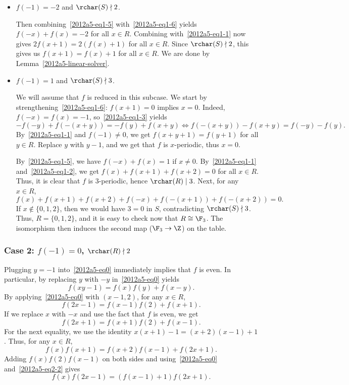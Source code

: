 \begin{itemize}

    \item
    $f(-1) = -2$ and $\rchar(S) \nmid 2$.
    
    Then combining~\eqref{2012a5-eq1-5} with~\eqref{2012a5-eq1-6} yields $f(-x) + f(x) = -2$ for all $x \in R$.
    Combining with~\eqref{2012a5-eq1-1} now gives $2 f(x + 1) = 2 (f(x) + 1)$ for all $x \in R$.
    Since $\rchar(S) \nmid 2$, this gives us $f(x + 1) = f(x) + 1$ for all $x \in R$.
    We are done by Lemma~\ref{2012a5-linear-solver}.


    \item
    $f(-1) = 1$ and $\rchar(S) \nmid 3$.

    We will assume that $f$ is reduced in this subcase.
    We start by strengthening~\eqref{2012a5-eq1-6}: $f(x + 1) = 0$ implies $x = 0$.
    Indeed, $f(-x) = f(x) = -1$, so~\eqref{2012a5-eq1-3} yields
    \[ -f(-y) + f(-(x + y)) = -f(y) + f(x + y) \iff f(-(x + y)) - f(x + y) = f(-y) - f(y). \]
    By~\eqref{2012a5-eq1-1} and $f(-1) \neq 0$, we get $f(x + y + 1) = f(y + 1)$ for all $y \in R$.
    Replace $y$ with $y - 1$, and we get that $f$ is $x$-periodic, thus $x = 0$.

    By~\eqref{2012a5-eq1-5}, we have $f(-x) + f(x) = 1$ if $x \neq 0$.
    By~\eqref{2012a5-eq1-1} and~\eqref{2012a5-eq1-2}, we get $f(x) + f(x + 1) + f(x + 2) = 0$ for all $x \in R$.
    Thus, it is clear that $f$ is $3$-periodic, hence $\rchar(R) \mid 3$.
    Next, for any $x \in R$,
    \[ f(x) + f(x + 1) + f(x + 2) + f(-x) + f(-(x + 1)) + f(-(x + 2)) = 0. \]
    If $x \notin \{0, 1, 2\}$, then we would have $3 = 0$ in $S$, contradicting $\rchar(S) \nmid 3$.
    Thus, $R = \{0, 1, 2\}$, and it is easy to check now that $R \cong \F_3$.
    The isomorphism then induces the second map ($\F_3 \to \Z$) on the table.

\end{itemize}



\subsubsection*{Case 2: $f(-1) = 0$, $\rchar(R) \nmid 2$}

Plugging $y = -1$ into~\eqref{2012a5-eq0} immediately implies that $f$ is even.
In particular, by replacing $y$ with $-y$ in~\eqref{2012a5-eq0} yields
\[ f(xy - 1) = f(x) f(y) + f(x - y). \tag{2.1}\label{2012a5-eq2-1} \]
By applying~\eqref{2012a5-eq0} with $(x - 1, 2)$, for any $x \in R$,
\[ f(2x - 1) = f(x - 1) f(2) + f(x + 1). \tag{2.2}\label{2012a5-eq2-2} \]
If we replace $x$ with $-x$ and use the fact that $f$ is even, we get
\[ f(2x + 1) = f(x + 1) f(2) + f(x - 1). \tag{2.3}\label{2012a5-eq2-3} \]
For the next equality, we use the identity $x(x + 1) - 1 = (x + 2)(x - 1) + 1$.
Thus, for any $x \in R$,
\[ f(x) f(x + 1) = f(x + 2) f(x - 1) + f(2x + 1). \]
Adding $f(x) f(2) f(x - 1)$ on both sides and using~\eqref{2012a5-eq0} and~\eqref{2012a5-eq2-2} gives
\[ f(x) f(2x - 1) = (f(x - 1) + 1) f(2x + 1). \tag{2.4}\label{2012a5-eq2-4} \]

